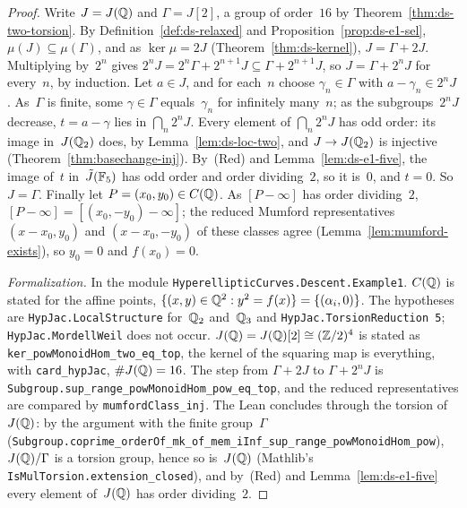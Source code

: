 \begin{proof}
\leanok
{}
Write $J = J(\mathbb{Q})$ and $\Gamma = J[2]$, a group of order~$16$ by Theorem~\ref{thm:ds-two-torsion}.
By Definition~\ref{def:ds-relaxed} and Proposition~\ref{prop:ds-e1-sel},
$\mu(J) \subseteq \mu(\Gamma)$, and as $\ker\mu = 2J$ (Theorem~\ref{thm:ds-kernel}),
$J = \Gamma + 2J$. Multiplying by~$2^n$ gives $2^nJ = 2^n\Gamma + 2^{n+1}J \subseteq \Gamma +
2^{n+1}J$, so $J = \Gamma + 2^nJ$ for every~$n$, by induction. Let $a \in J$, and for each~$n$
choose $\gamma_n \in \Gamma$ with $a - \gamma_n \in 2^nJ$. As~$\Gamma$ is finite, some
$\gamma \in \Gamma$ equals~$\gamma_n$ for infinitely many~$n$; as the subgroups~$2^nJ$ decrease,
$t = a - \gamma$ lies in $\bigcap_n 2^nJ$. Every element of $\bigcap_n 2^nJ$ has odd order: its
image in~$J(\mathbb{Q}_2)$ does, by Lemma~\ref{lem:ds-loc-two}, and $J \to J(\mathbb{Q}_2)$ is injective
(Theorem~\ref{thm:basechange-inj}). By~(Red) and Lemma~\ref{lem:ds-e1-five}, the image of~$t$
in~$\tilde J(\mathbb{F}_5)$ has odd order and order dividing~$2$, so it is~$0$, and $t = 0$. So
$J = \Gamma$. Finally let $P = (x_0, y_0) \in C(\mathbb{Q})$. As $[P - \infty]$ has order dividing~$2$,
$[P - \infty] = [(x_0, -y_0) - \infty]$; the reduced Mumford representatives $(x - x_0, y_0)$
and $(x - x_0, -y_0)$ of these classes agree (Lemma~\ref{lem:mumford-exists}), so $y_0 = 0$ and
$f(x_0) = 0$.

\emph{Formalization.} In the module \texttt{HyperellipticCurves.Descent.Example1}. $C(\mathbb{Q})$ is
stated for the affine points, $\{(x, y) \in \mathbb{Q}^2 : y^2 = f(x)\} = \{(\alpha_i, 0)\}$. The
hypotheses are \texttt{HypJac.LocalStructure} for~$\mathbb{Q}_2$ and~$\mathbb{Q}_3$ and
\texttt{HypJac.TorsionReduction 5}; \texttt{HypJac.MordellWeil} does not occur.
$J(\mathbb{Q}) = J(\mathbb{Q})[2] \cong (\mathbb{Z}/2)^4$ is stated as \texttt{ker\_powMonoidHom\_two\_eq\_top}, the
kernel of the squaring map is everything, with \texttt{card\_hypJac}, $\#J(\mathbb{Q}) = 16$. The step
from $\Gamma + 2J$ to $\Gamma + 2^nJ$ is \texttt{Subgroup.sup\_range\_powMonoidHom\_pow\_eq\_top},
and the reduced representatives are compared by \texttt{mumfordClass\_inj}. The Lean concludes
through the torsion of~$J(\mathbb{Q})$: by the argument with the finite group~$\Gamma$
(\texttt{Subgroup.coprime\_orderOf\_mk\_of\_mem\_iInf\_sup\_range\_powMonoidHom\_pow}),
$J(\mathbb{Q})/\Gamma$ is a torsion group, hence so is~$J(\mathbb{Q})$ (Mathlib's
\texttt{IsMulTorsion.extension\_closed}), and by~(Red) and Lemma~\ref{lem:ds-e1-five} every element
of~$J(\mathbb{Q})$ has order dividing~$2$.
\end{proof}


